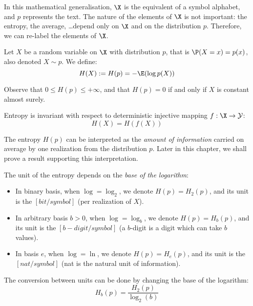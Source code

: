 \documentclass[toc]{../cs-classes/cs-classes}
\begin{document}
\begin{remark}
    In this mathematical generalisation, $\X$ is the equivalent of a symbol alphabet, and $p$ represents the text. The nature of the elements of $\X$ is not important: the entropy, the average, \dots depend only on $\X$ and on the distribution $p$. Therefore, we can re-label the elements of $\X$.
\end{remark}

\begin{definition}
    Let $X$ be a random variable on $\X$ with distribution $p$, that is $\P(X=x) = p(x)$, also denoted $X \sim p$. We define:
    \begin{equation}
        H(X) := H(p) = -\E(\log p(X))
    \end{equation}
\end{definition}

Observe that $0\leq H(p) \leq +\infty$, and that $H(p)=0$ if and only if $X$ is constant almost surely.

\begin{property}
    Entropy is invariant with respect to deterministic injective mapping $f: \X \to \mathcal{Y}$:
    \begin{equation*}
        H(X) = H(f(X))
    \end{equation*}
\end{property}

The entropy $H(p)$ can be interpreted as the \emph{amount of information} carried on average by one realization from the distribution $p$. Later in this chapter, we shall prove a result supporting this interpretation. 

\begin{definition} The unit of the entropy depends on the \emph{base of the logarithm}:
    \begin{itemize}
        \item In binary basis, when $\log = \log_2$, we denote $H(p)=H_2(p)$, and its unit is the $[bit/symbol]$ (per realization of $X$).
        \item In arbitrary basis $b>0$, when $\log = \log_b$, we denote $H(p)=H_b(p)$, and its unit is the $[b-digit/symbol]$ (a $b$-digit is a digit which can take $b$ values).
        \item In basis $e$, when $\log = \ln$, we denote $H(p)=H_e(p)$, and its unit is the $[nat/symbol]$ (nat is the natural unit of information).
    \end{itemize}
    
    The conversion between units can be done by changing the base of the logarithm:
    \begin{equation*}
        H_b(p) = \frac{H_2(p)}{\log_2(b)}
    \end{equation*}
\end{definition}
\end{document}
